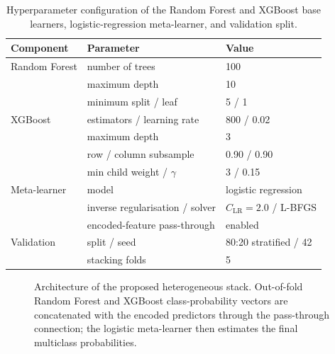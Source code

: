 \documentclass{elektr}
\begin{document}
\begin{table}[H]
\centering
\caption{Hyperparameter configuration of the Random Forest and XGBoost base learners, logistic-regression meta-learner, and validation split.}
\label{tab:hyper}
\small
\begin{tabular}{lll}
\toprule
Component & Parameter & Value \\
\midrule
Random Forest & number of trees & 100 \\
 & maximum depth & 10 \\
 & minimum split / leaf & 5 / 1 \\
XGBoost & estimators / learning rate & 800 / 0.02 \\
 & maximum depth & 3 \\
 & row / column subsample & 0.90 / 0.90 \\
 & min child weight / $\gamma$ & 3 / 0.15 \\
Meta-learner & model & logistic regression \\
 & inverse regularisation / solver & $C_{\mathrm{LR}}=2.0$ / L-BFGS \\
 & encoded-feature pass-through & enabled \\
Validation & split / seed & 80:20 stratified / 42 \\
 & stacking folds & 5 \\
\bottomrule
\end{tabular}
\end{table}

\begin{figure}[H]
\centering
{}
\caption{Architecture of the proposed heterogeneous stack. Out-of-fold Random Forest and XGBoost class-probability vectors are concatenated with the encoded predictors through the pass-through connection; the logistic meta-learner then estimates the final multiclass probabilities.}
\label{fig:stack}
\end{figure}
\end{document}
